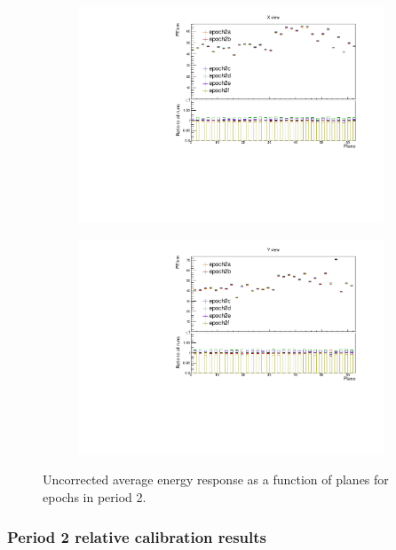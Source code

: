\documentclass[12pt,a4paper]{article}
\begin{document}
\begin{figure}[h]
\centering
\begin{subfigure}[b]{0.495\textwidth}
\centering
\includegraphics[width=\textwidth]{Plots/Attenprofs_P2Data_PlanePE_X_Combined.pdf}
\end{subfigure}
\begin{subfigure}[b]{0.495\textwidth}
\centering
\includegraphics[width=\textwidth]{Plots/Attenprofs_P2Data_PlanePE_Y_Combined.pdf}
\end{subfigure}
\caption{Uncorrected average energy response as a function of planes for epochs in period 2.}
\label{figCalibhistPlanePE_period2}
\end{figure}

\subsubsection*{Period 2 relative calibration results}
\end{document}
